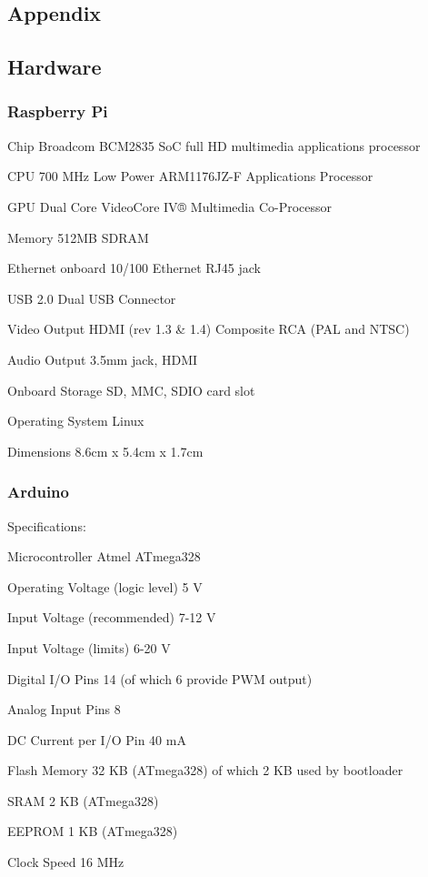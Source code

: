 \documentclass[12pt]{report}
\begin{document}
\begin{appendices}
\chapter{Appendix}
\section{Hardware}
\subsection{Raspberry Pi}

Chip Broadcom BCM2835 SoC full HD multimedia applications processor

CPU 700 MHz Low Power ARM1176JZ-F Applications Processor

GPU	Dual Core VideoCore IV® Multimedia Co-Processor
	  	
Memory 512MB SDRAM

Ethernet onboard 10/100 Ethernet RJ45 jack

USB 2.0 Dual USB Connector

Video Output HDMI (rev 1.3 \& 1.4) Composite RCA (PAL and NTSC)

Audio Output 3.5mm jack, HDMI

Onboard Storage SD, MMC, SDIO card slot

Operating System Linux

Dimensions 8.6cm x 5.4cm x 1.7cm
\subsection{Arduino}

Specifications:

Microcontroller	Atmel ATmega328

Operating Voltage (logic level)	5 V

Input Voltage (recommended)	7-12 V

Input Voltage (limits)	6-20 V

Digital I/O Pins	14 (of which 6 provide PWM output)

Analog Input Pins	8

DC Current per I/O Pin	40 mA

Flash Memory	32 KB (ATmega328) of which 2 KB used by bootloader

SRAM  2 KB (ATmega328)

EEPROM	1 KB (ATmega328)

Clock Speed	16 MHz


\end{appendices}
\end{document}
